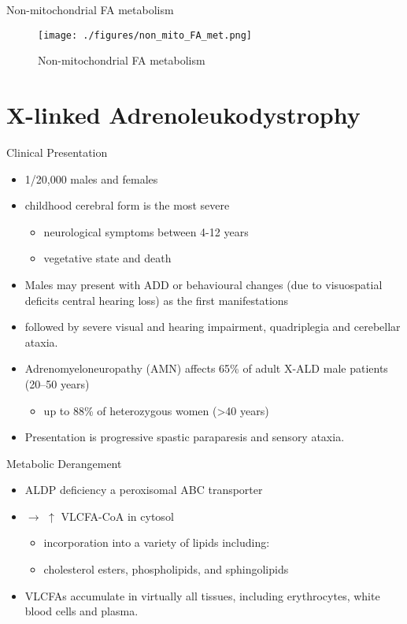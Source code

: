 \documentclass[presentation, smaller]{beamer}
\begin{document}
\begin{frame}[label={sec:orge97e3c5}]{Non-mitochondrial FA metabolism}
\begin{figure}[htbp]
\centering
\texttt{[image: ./figures/non\_mito\_FA\_met.png]}
\caption[Non-mitochondrial FA metabolism]{\label{fig:org48d612b}
Non-mitochondrial FA metabolism}
\end{figure}
\end{frame}

\section{X-linked Adrenoleukodystrophy}
\label{sec:org9ad7066}
\begin{frame}[label={sec:org6db282f}]{Clinical Presentation}
\begin{itemize}
\item 1/20,000 males and females
\item childhood cerebral form is the most severe
\begin{itemize}
\item neurological symptoms between 4-12 years
\item vegetative state and death
\end{itemize}
\item Males may present with ADD or behavioural changes (due to
visuospatial deficits \textpm{} central hearing loss) as the first manifestations
\item followed by severe visual and hearing impairment, quadriplegia and
cerebellar ataxia.
\item Adrenomyeloneuropathy (AMN) affects 65\% of adult X-ALD male patients (20–50 years)
\begin{itemize}
\item up to 88\% of heterozygous women (>40 years)
\end{itemize}
\item Presentation is progressive spastic paraparesis and sensory ataxia.
\end{itemize}
\end{frame}

\begin{frame}[label={sec:org244d978}]{Metabolic Derangement}
\begin{itemize}
\item ALDP deficiency a peroxisomal ABC transporter
\item \(\to\) \(\uparrow\) VLCFA-CoA in cytosol
\begin{itemize}
\item incorporation into a variety of lipids including:
\item cholesterol esters, phospholipids, and sphingolipids
\end{itemize}
\item VLCFAs accumulate in virtually all tissues, including erythrocytes,
white blood cells and plasma.
\end{itemize}
\end{frame}
\end{document}

